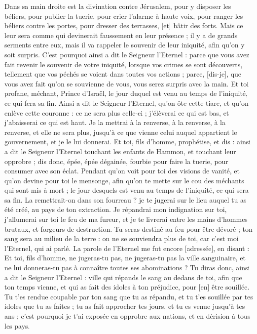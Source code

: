 \begin{multicols}{2}
Dans sa main droite est la divination contre Jérusalem, pour y disposer les béliers, pour publier la tuerie, pour crier l'alarme à haute voix, pour ranger les béliers contre les portes, pour dresser des terrasses, [et] bâtir des forts.
Mais ce leur sera comme qui devinerait faussement en leur présence ; il y a de grands serments entre eux, mais il va rappeler le souvenir de leur iniquité, afin qu'on y soit surpris.
C'est pourquoi ainsi a dit le Seigneur l'Eternel : parce que vous avez fait revenir le souvenir de votre iniquité, lorsque vos crimes se sont découverts, tellement que vos péchés se voient dans toutes vos actions ; parce, [dis-je], que vous avez fait qu'on se souvienne de vous, vous serez surpris avec la main.
Et toi profane, méchant, Prince d'Israël, le jour duquel est venu au temps de l'iniquité, ce qui fera sa fin.
Ainsi a dit le Seigneur l'Eternel, qu'on ôte cette tiare, et qu'on enlève cette couronne : ce ne sera plus celle-ci ; j'élèverai ce qui est bas, et j'abaisserai ce qui est haut.
Je la mettrai à la renverse, à la renverse, à la renverse, et elle ne sera plus, jusqu'à ce que vienne celui auquel appartient le gouvernement, et je le lui donnerai.
Et toi, fils d'homme, prophétise, et dis : ainsi a dit le Seigneur l'Eternel touchant les enfants de Hammon, et touchant leur opprobre ; dis donc, épée, épée dégainée, fourbie pour faire la tuerie, pour consumer avec son éclat.
Pendant qu'on voit pour toi des visions de vanité, et qu'on devine pour toi le mensonge, afin qu'on te mette sur le cou des méchants qui sont mis à mort ; le jour desquels est venu au temps de l'iniquité, ce qui sera sa fin.
La remettrait-on dans son fourreau ? je te jugerai sur le lieu auquel tu as été créé, au pays de ton extraction.
Je répandrai mon indignation sur toi, j'allumerai sur toi le feu de ma fureur, et je te livrerai entre les mains d'hommes brutaux, et forgeurs de destruction.
Tu seras destiné au feu pour être dévoré ; ton sang sera au milieu de la terre : on ne se souviendra plus de toi, car c'est moi l'Eternel, qui ai parlé.
\VerseOne{}La parole de l'Eternel me fut encore [adressée], en disant :
Et toi, fils d'homme, ne jugeras-tu pas, ne jugeras-tu pas la ville sanguinaire, et ne lui donneras-tu pas à connaître toutes ses abominations ?
Tu diras donc, ainsi a dit le Seigneur l'Eternel : ville qui répands le sang au dedans de toi, afin que ton temps vienne, et qui as fait des idoles à ton préjudice, pour [en] être souillée.
Tu t'es rendue coupable par ton sang que tu as répandu, et tu t'es souillée par tes idoles que tu as faites ; tu as fait approcher tes jours, et tu es venue jusqu'à tes ans ; c'est pourquoi je t'ai exposée en opprobre aux nations, et en dérision à tous les pays.

\end{multicols}
